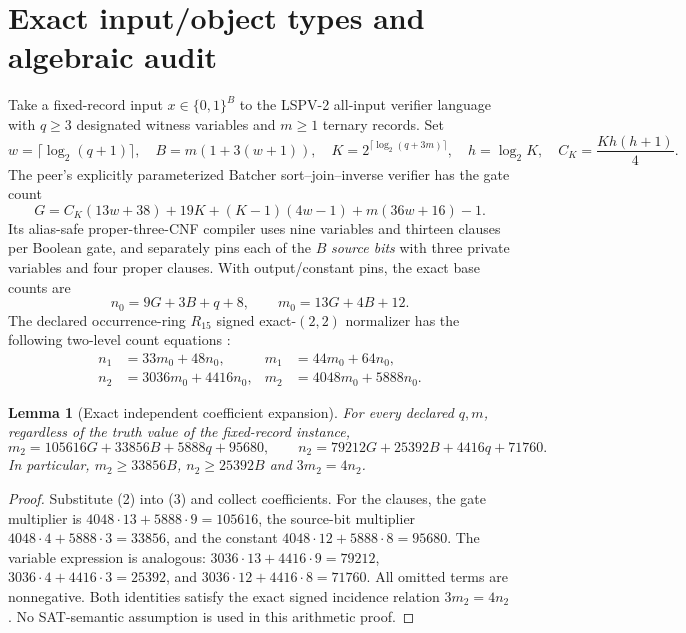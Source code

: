 \documentclass[11pt]{article}
\newtheorem{lemma}[theorem]{Lemma}
\begin{document}
\section{Exact input/object types and algebraic audit}
Take a fixed-record input $x\in\{0,1\}^B$ to the LSPV-2 all-input verifier language with $q\ge3$ designated witness variables and $m\ge1$ ternary records. Set
\[
w=\lceil\log_2(q+1)\rceil,\quad B=m(1+3(w+1)),\quad
K=2^{\lceil\log_2(q+3m)\rceil},\quad h=\log_2K,\quad C_K=\frac{Kh(h+1)}4.
\]
The peer's explicitly parameterized Batcher sort--join--inverse verifier has the gate count
\[
G=C_K(13w+38)+19K+(K-1)(4w-1)+m(36w+16)-1.\tag{1}
\]
Its alias-safe proper-three-CNF compiler uses nine variables and thirteen clauses per Boolean gate, and separately pins each of the $B$ \emph{source bits} with three private variables and four proper clauses. With output/constant pins, the exact base counts are
\[
 n_0=9G+3B+q+8,\qquad m_0=13G+4B+12.\tag{2}
\]
The declared occurrence-ring $R_{15}$ signed exact-$(2,2)$ normalizer has the following two-level count equations \cite{sort166}:
\[
\begin{aligned}
n_1&=33m_0+48n_0,&m_1&=44m_0+64n_0,\\
n_2&=3036m_0+4416n_0,&m_2&=4048m_0+5888n_0.
\end{aligned}\tag{3}
\]
\begin{lemma}[Exact independent coefficient expansion]
For every declared $q,m$, regardless of the truth value of the fixed-record instance,
\[
\boxed{m_2=105616G+33856B+5888q+95680},\qquad
\boxed{n_2=79212G+25392B+4416q+71760}.\tag{4}
\]
In particular, $m_2\ge33856B$, $n_2\ge25392B$ and $3m_2=4n_2$.
\end{lemma}
\begin{proof}
Substitute (2) into (3) and collect coefficients. For the clauses, the gate multiplier is $4048\cdot13+5888\cdot9=105616$, the source-bit multiplier $4048\cdot4+5888\cdot3=33856$, and the constant $4048\cdot12+5888\cdot8=95680$. The variable expression is analogous: $3036\cdot13+4416\cdot9=79212$, $3036\cdot4+4416\cdot3=25392$, and $3036\cdot12+4416\cdot8=71760$. All omitted terms are nonnegative. Both identities satisfy the exact signed incidence relation $3m_2=4n_2$. No SAT-semantic assumption is used in this arithmetic proof.
\end{proof}
\end{document}
